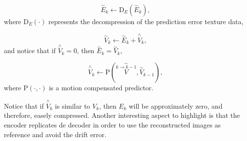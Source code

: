 \begin{equation}
  \overset{\sim}{E}_k \leftarrow \text{D}_{E}(\overset{\sim}{E}_k),
  \tag{h}
\end{equation}
where D$_{E}(\cdot)$ represents the decompression of the prediction
error texture data,

\begin{equation}
  \overset{\sim}{V}_k \leftarrow \overset{\sim}{E}_k + \overset{\wedge}{V}_k,
  \tag{i}
\end{equation}
and notice that if $\overset{\wedge}{V}_k=0$, then
$\overset{\sim}{E}_k = \overset{\sim}{V}_k$,

\begin{equation}
  \overset{\wedge}{V}_k \leftarrow \text{P}(\overset{\sim}{\overset{k\rightarrow k-1}{V}}, \overset{\sim}{V}_{k-1}),
  \tag{j}
\end{equation}
where P$(\cdot,\cdot)$ is a motion compensated predictor.

Notice that if $\overset{\wedge}{{V}}_k$ is similar to $V_k$, then
$E_k$ will be approximately zero, and therefore, easely
compressed. Another interesting aspect to highlight is that the
encoder replicates de decoder in order to use the reconstructed images
as reference and avoid the drift error.


